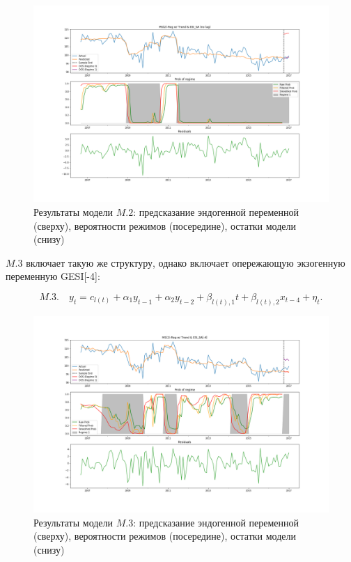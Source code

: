 \documentclass[a4paper,14pt]{extreport}
\begin{document}
\begin{figure}[H]
	\includegraphics[width=\linewidth]{img/manual/model_m2.png}
	\caption{Результаты модели $M.2$: предсказание эндогенной переменной (сверху), вероятности режимов (посередине), остатки модели (снизу)}
	\label{fig:sm_model_m2}
\end{figure}

$M.3$ включает такую же структуру, однако включает опережающую экзогенную переменную GESI[-4]:

\begin{equation}
	M.3. \quad y_t = c_{l(t)} + \alpha_1 y_{t-1} + \alpha_2 y_{t-2} + \beta_{l(t), 1} t + \beta_{l(t), 2} x_{t-4} + \eta_t .
	\label{eq:ms_arx_m3}
\end{equation}

\begin{figure}[H]
	\includegraphics[width=\linewidth]{img/manual/model_m3.png}
	\caption{Результаты модели $M.3$: предсказание эндогенной переменной (сверху), вероятности режимов (посередине), остатки модели (снизу)}
	\label{fig:sm_model_m3}
\end{figure}
\end{document}

